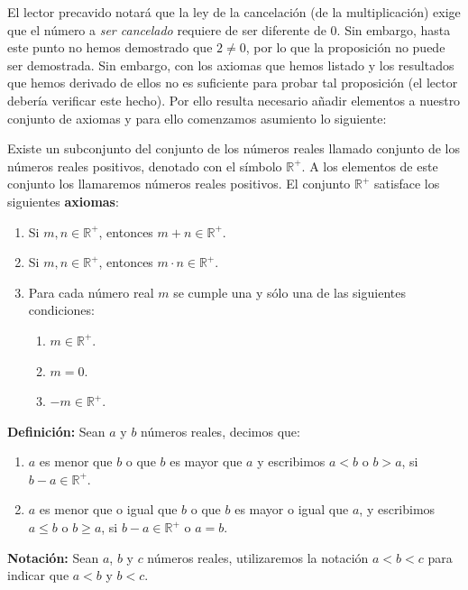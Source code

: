 \documentclass[11pt]{article}
\newcommand{\R}{\mathbb{R}}
\begin{document}
El lector precavido notará que la ley de la cancelación (de la multiplicación) exige que el número a \textit{ser cancelado} requiere de ser diferente de $0$. Sin embargo, hasta este punto no hemos demostrado que $2\neq 0$, por lo que la proposición no puede ser demostrada. Sin embargo, con los axiomas que hemos listado y los resultados que hemos derivado de ellos no es suficiente para probar tal proposición (el lector debería verificar este hecho). Por ello resulta necesario añadir elementos a nuestro conjunto de axiomas y para ello comenzamos asumiento lo siguiente:

Existe un subconjunto del conjunto de los números reales llamado conjunto de los números reales positivos, denotado con el símbolo $\R^+$. A los elementos de este conjunto los llamaremos números reales positivos. El conjunto $\R^+$ satisface los siguientes \textbf{axiomas}:
%
\begin{enumerate}[label=O\arabic*)]
\item Si $m, n \in \R^+$, entonces $m + n \in \R^+$.
\item Si $m, n \in \R^+$, entonces $m \cdot n \in \R^+$.
\item Para cada número real $m$ se cumple una y sólo una de las siguientes condiciones:
    \begin{enumerate}[label=\roman*)]
    \item $m \in \R^+$.
    \item $m = 0$.
    \item $-m \in \R^+$.\
    \end{enumerate}
\end{enumerate}
%
\textbf{Definición:} Sean $a$ y $b$ números reales, decimos que:%
%
\begin{enumerate}
    \item $a$ es menor que $b$ o que $b$ es mayor que $a$ y escribimos $a<b$ o $b>a$, si $b-a \in \R^+$.
    \item $a$ es menor que o igual que $b$ o que $b$ es mayor o igual que $a$, y escribimos $a \leq b$ o $b \geq a$, si $b - a \in \R^+$ o $a = b$.
\end{enumerate}

\textbf{Notación:} Sean $a$, $b$ y $c$ números reales, utilizaremos la notación $a<b<c$ para indicar que $a<b$ y $b<c$.

\pagebreak
\end{document}
